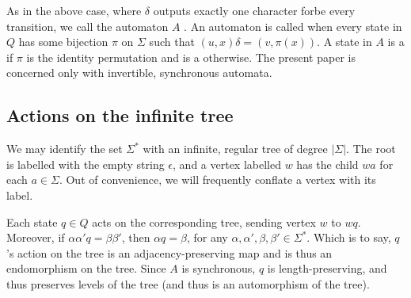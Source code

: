 \documentclass[11pt]{article}
\begin{document}
As in the above case, where $\delta$ outputs exactly one character forbe
every transition, we call the automaton $A$ . An
automaton is called  when every state in $Q$ has some
bijection $\pi$ on $\Sigma$ such that $(u, x)\delta = (v, \pi(x))$. A
state in $A$ is a  if $\pi$ is the identity
permutation and is a  otherwise. The present paper
is concerned only with invertible, synchronous automata.

\subsection{Actions on the infinite tree}

We may identify the set $\Sigma^*$ with an infinite, regular tree of
degree $|\Sigma|$. The root is labelled with the empty string
$\epsilon$, and a vertex labelled $w$ has the child $wa$ for each
$a \in \Sigma$. Out of convenience, we will frequently conflate a
vertex with its label.

\begin{center}
\end{center}

Each state $q \in Q$ acts on the corresponding tree, sending vertex
$w$ to $wq$. Moreover, if $\alpha \alpha' q = \beta \beta'$, then
$\alpha q = \beta$, for any
$\alpha, \alpha', \beta, \beta' \in \Sigma^*$. Which is to say, $q$'s
action on the tree is an adjacency-preserving map and is thus an
endomorphism on the tree. Since $A$ is synchronous, $q$ is
length-preserving, and thus preserves levels of the tree (and thus is
an automorphism of the tree).
\end{document}
